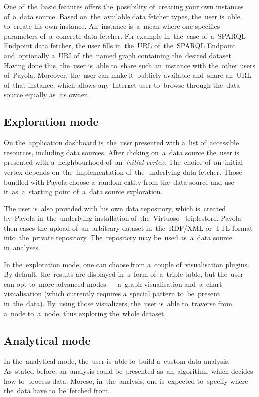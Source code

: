 One of~the~basic features offers the~possibility of~creating your own instances of~a~data source. Based on~the~available data fetcher types, the~user is~able to~create 
his own instance. An~instance is~a~mean where one specifies parameters of~a~concrete data fetcher. For example in~the~case of~a~SPARQL Endpoint data fetcher,
the user fills in~the~URL of~the~SPARQL Endpoint and~optionally a~URI of~the~named graph 
containing the~desired dataset. Having done this, the~user is~able to~share 
such an~instance with the~other users of~Payola.
Moreover, the~user can make it~publicly available and~share an~URL of~that instance, which allows any~Internet user to~browse through the~data source equally as~its owner.

\subsection{Exploration mode}
On the~application dashboard is~the~user presented with a~list of~accessible 
resources, including data sources. After clicking on~a~data source the~user is
presented with a~neighbourhood of~an~\emph{initial vertex}. The~choice of~an~initial vertex
depends on~the~implementation of~the~underlying data fetcher.
Those bundled with Payola choose a~random entity from the~data source
and use it~as~a~starting point of~a~data source exploration.

The user is~also provided with his own data repository, which is~created by~Payola in~the~underlying installation of~the~Virtuoso~\cite{virtuoso} triplestore. Payola then eases 
the upload of~an~arbitrary dataset in~the~RDF/XML or~TTL 
format into~the~private repository. The~repository may be~used as~a~data source in~analyses.

In the~exploration mode, one can choose from a~couple of~visualisation plugins. 
By default, the~results are displayed in~a~form of~a~triple table, but the~user can 
opt to~more advanced modes --- a~graph visualisation and~a~chart visualisation
(which currently requires a~special pattern to~be~present in~the~data). By~using those 
visualizers, the~user is~able to~traverse from a~node to~a~node, thus exploring the~whole 
dataset.

\subsection{Analytical mode}
In the~analytical mode, the~user is~able to~build a~custom data analysis. As~stated before, an~analysis could be~presented as~an~algorithm, which decides 
how to~process data. Moreso, in~the~analysis, one is~expected to~specify 
where the~data have to~be~fetched from.

